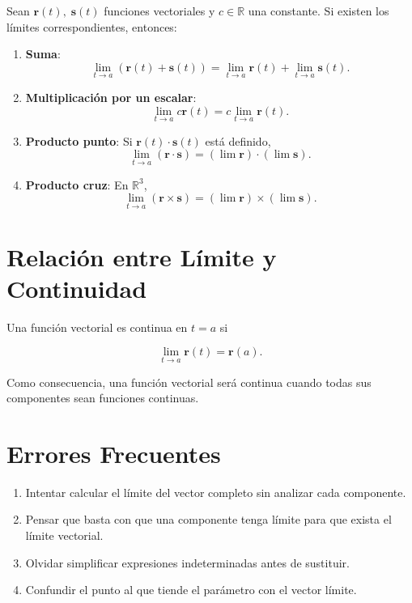 \begin{teorema}
Sean $ \mathbf{r}(t), \; \mathbf{s}(t) $ funciones vectoriales y $ c \in \mathbb{R} $ una constante. Si existen los límites correspondientes, entonces:

\begin{enumerate}
    \item \textbf{Suma}:
        \[
        \lim_{t\to a}
        \left(
        \mathbf{r}(t)+\mathbf{s}(t)
        \right)
        =
        \lim_{t\to a}\mathbf{r}(t)
        +
        \lim_{t\to a}\mathbf{s}(t).
        \]
    \item \textbf{Multiplicación por un escalar}:
        \[
        \lim_{t\to a}
        c\mathbf{r}(t)
        =
        c
        \lim_{t\to a}\mathbf{r}(t).
        \]
    \item \textbf{Producto punto}: Si $ \mathbf{r}(t) \cdot \mathbf{s}(t) $
        está definido,
        \[
        \lim_{t\to a}
        \left(
        \mathbf{r}\cdot\mathbf{s}
        \right)
        =
        \left(
        \lim\mathbf{r}
        \right)
        \cdot
        \left(
        \lim\mathbf{s}
        \right).
        \]
    \item \textbf{Producto cruz}: En $\mathbb{R}^3$,
        \[
        \lim_{t\to a}
        \left(
        \mathbf{r}\times\mathbf{s}
        \right)
        =
        \left(
        \lim\mathbf{r}
        \right)
        \times
        \left(
        \lim\mathbf{s}
        \right).
        \]
\end{enumerate}
\end{teorema}

\section*{Relación entre Límite y Continuidad}

Una función vectorial es continua en $t=a$ si

\[
\lim_{t\to a}\mathbf{r}(t)
=
\mathbf{r}(a).
\]

Como consecuencia, una función vectorial será continua cuando todas sus componentes sean funciones continuas.

\section*{Errores Frecuentes}

\begin{enumerate}
    \item Intentar calcular el límite del vector completo sin analizar cada componente.

    \item Pensar que basta con que una componente tenga límite para que exista el límite vectorial.

    \item Olvidar simplificar expresiones indeterminadas antes de sustituir.

    \item Confundir el punto al que tiende el parámetro con el vector límite.
\end{enumerate}

